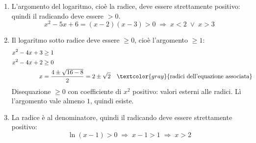 \begin{question}[ID=1.4, subtitle={Dominio di funzioni con condizioni multiple}, difficulty=difficile, tags={funzioni, dominio}]
\begin{explanation}
\begin{enumerate}
\[\begin{aligned}
    \dfrac{3}{x-2} &\geq 0
    \end{aligned}\]
    Il numeratore è positivo, quindi serve $x-2>0$: $x>2$. In questo intervallo l'argomento del logaritmo è anche positivo.
    \item L'argomento del logaritmo, cioè la radice, deve essere strettamente positivo: quindi il radicando deve essere $>0$.
    \[ x^2-5x+6=(x-2)(x-3)>0 \;\Rightarrow\; x<2 \;\vee\; x>3 \]
    \item Il logaritmo sotto radice deve essere $\geq0$, cioè l'argomento $\geq 1$:
    \[\begin{aligned}
    x^2-4x+3 &\geq 1\\
    x^2-4x+2 &\geq 0\\
    x &= \dfrac{4\pm\sqrt{16-8}}{2}=2\pm\sqrt2 && \textcolor{gray}{\text{radici dell'equazione associata}}
    \end{aligned}\]
    Disequazione $\geq0$ con coefficiente di $x^2$ positivo: valori esterni alle radici. Lì l'argomento vale almeno $1$, quindi esiste.
    \item La radice è al denominatore, quindi il radicando deve essere strettamente positivo:
    \[ \ln(x-1)>0 \;\Rightarrow\; x-1>1 \;\Rightarrow\; x>2 \]
\end{enumerate}
\end{explanation}
\end{question}


